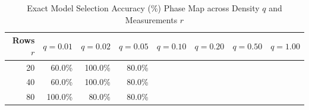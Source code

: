 \begin{table}[htbp]
\centering
\small
\caption{Exact Model Selection Accuracy (\%) Phase Map across Density $q$ and Measurements $r$}
\label{tab:phase_map}
\begin{tabular}{r|rrrrrrr}
\toprule
Rows $r$ & $q=0.01$ & $q=0.02$ & $q=0.05$ & $q=0.10$ & $q=0.20$ & $q=0.50$ & $q=1.00$ \\
\midrule
 20 &  60.0\% & 100.0\% &  80.0\% \\
 40 &  60.0\% & 100.0\% &  80.0\% \\
 80 & 100.0\% &  80.0\% &  80.0\% \\
\bottomrule
\end{tabular}
\end{table}
